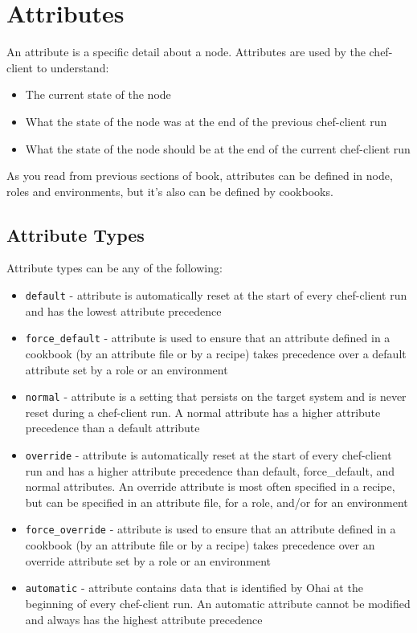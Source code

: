 \section{Attributes}
\label{sec:server-attributes}

An attribute is a specific detail about a node. Attributes are used by the chef-client to understand:

\begin{itemize}
  \item The current state of the node
  \item What the state of the node was at the end of the previous chef-client run
  \item What the state of the node should be at the end of the current chef-client run
\end{itemize}

As you read from previous sections of book, attributes can be defined in node, roles and environments, but it's also can be defined by cookbooks.

\subsection{Attribute Types}

Attribute types can be any of the following:

\begin{itemize}
  \item \lstinline!default! - attribute is automatically reset at the start of every chef-client run and has the lowest attribute precedence
  \item \lstinline!force_default! - attribute is used to ensure that an attribute defined in a cookbook (by an attribute file or by a recipe) takes precedence over a default attribute set by a role or an environment
  \item \lstinline!normal! - attribute is a setting that persists on the target system and is never reset during a chef-client run. A normal attribute has a higher attribute precedence than a default attribute
  \item \lstinline!override! - attribute is automatically reset at the start of every chef-client run and has a higher attribute precedence than default, force\_default, and normal attributes. An override attribute is most often specified in a recipe, but can be specified in an attribute file, for a role, and/or for an environment
  \item \lstinline!force_override! - attribute is used to ensure that an attribute defined in a cookbook (by an attribute file or by a recipe) takes precedence over an override attribute set by a role or an environment
  \item \lstinline!automatic! - attribute contains data that is identified by Ohai at the beginning of every chef-client run. An automatic attribute cannot be modified and always has the highest attribute precedence
\end{itemize}

